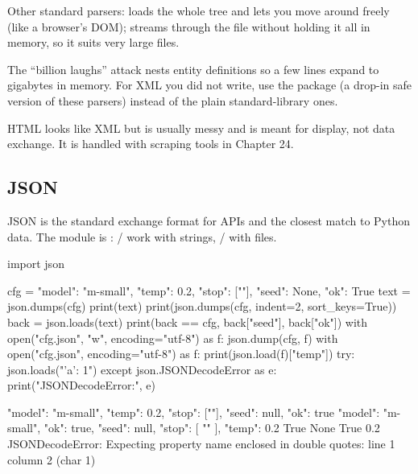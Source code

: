 Other standard parsers:  loads the whole tree and lets you move around
freely (like a browser's DOM);  streams through the file without holding it
all in memory, so it suits very large files.

\begin{trap}
The ``billion laughs'' attack nests entity definitions so a few lines expand to gigabytes
in memory. For XML you did not write, use the  package (a drop-in
safe version of these parsers) instead of the plain standard-library ones.
\end{trap}

HTML looks like XML but is usually messy and is meant for display, not data exchange. It
is handled with scraping tools in Chapter 24.

\subsection{JSON}

JSON is the standard exchange format for APIs and the closest match to Python data. The
module is : / work with strings, /
with files.

\begin{pycode}
import json

cfg = {"model": "m-small", "temp": 0.2, "stop": ["\n"],
       "seed": None, "ok": True}
text = json.dumps(cfg)
print(text)
print(json.dumps(cfg, indent=2, sort_keys=True))
back = json.loads(text)
print(back == cfg, back["seed"], back["ok"])
with open("cfg.json", "w", encoding="utf-8") as f:
    json.dump(cfg, f)
with open("cfg.json", encoding="utf-8") as f:
    print(json.load(f)["temp"])
try:
    json.loads("{'a': 1}")
except json.JSONDecodeError as e:
    print("JSONDecodeError:", e)
\end{pycode}
\begin{rawcode}
{"model": "m-small", "temp": 0.2, "stop": ["\n"], "seed": null, "ok": true}
{
  "model": "m-small",
  "ok": true,
  "seed": null,
  "stop": [
    "\n"
  ],
  "temp": 0.2
}
True None True
0.2
JSONDecodeError: Expecting property name enclosed in double quotes: line 1 column 2 (char 1)
\end{rawcode}

